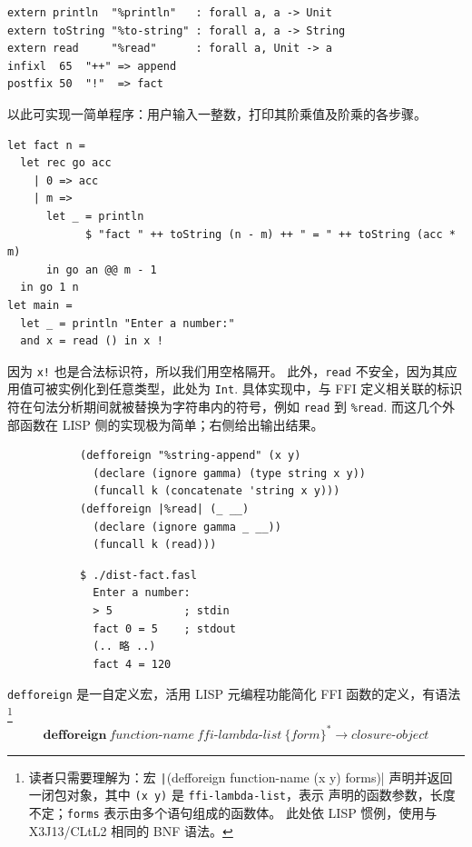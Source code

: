 \begin{verbatim}
extern println  "%println"   : forall a, a -> Unit
extern toString "%to-string" : forall a, a -> String
extern read     "%read"      : forall a, Unit -> a
infixl  65  "++" => append
postfix 50  "!"  => fact
\end{verbatim}
  以此可实现一简单程序：用户输入一整数，打印其阶乘值及阶乘的各步骤。
\begin{verbatim}
let fact n =
  let rec go acc
    | 0 => acc
    | m =>
      let _ = println
            $ "fact " ++ toString (n - m) ++ " = " ++ toString (acc * m)
      in go an @@ m - 1
  in go 1 n
let main =
  let _ = println "Enter a number:"
  and x = read () in x !
\end{verbatim}
  因为 \texttt{x!} 也是合法标识符，所以我们用空格隔开。
  此外，\texttt{read} 不安全，因为其应用值可被实例化到任意类型，此处为 \texttt{Int}.
  具体实现中，与 FFI 定义相关联的标识符在句法分析期间就被替换为字符串内的符号，例如
  \texttt{read} 到 \texttt{\%read}. 而这几个外部函数在 LISP 侧的实现极为简单；右侧给出输出结果。
  \begin{figure}[H]\centering
    \begin{subfigure}[c]{.65\textwidth}\centering
    \begin{verbatim}
(defforeign "%string-append" (x y)
  (declare (ignore gamma) (type string x y))
  (funcall k (concatenate 'string x y)))
(defforeign |%read| (_ __)
  (declare (ignore gamma _ __))
  (funcall k (read)))
\end{verbatim}
    \end{subfigure}%
    \begin{subfigure}[c]{.35\textwidth}\centering
\begin{Verbatim}[baselinestretch=1]
$ ./dist-fact.fasl
  Enter a number:
  > 5           ; stdin
  fact 0 = 5    ; stdout
  (.. 略 ..)
  fact 4 = 120
\end{Verbatim}
    \end{subfigure}
  \end{figure}
  \texttt{defforeign} 是一自定义宏，活用 LISP 元编程功能简化 FFI 函数的定义，有语法\footnote{
    读者只需要理解为：宏 \texttt|(defforeign function-name (x y) forms)|
    声明并返回一闭包对象，其中 \texttt{(x y)} 是 \texttt{ffi-lambda-list}，表示
    声明的函数参数，长度不定；\texttt{forms} 表示由多个语句组成的函数体。
    此处依 LISP 惯例，使用与 X3J13/CLtL2 相同的 BNF 语法。
  }
  \begingroup\setlength{\abovedisplayskip}{3pt}\setlength{\belowdisplayskip}{3pt}
  \begin{equation}
    \mathbf{defforeign}\ \textit{function-name}\ \textit{ffi-lambda-list}\ \{\textit{form}\}^*\longrightarrow \textit{closure-object}
  \end{equation}
